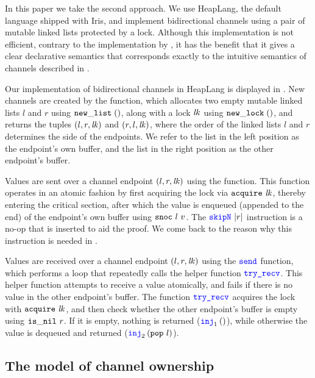 \noindent
In this paper we take the second approach.
We use HeapLang, the default language shipped with Iris, and
implement bidirectional channels using a pair of mutable linked lists protected
by a lock.
Although this implementation is not efficient, contrary to \eg the implementation
by \citet{bizjak-PACMPL2019}, it has the benefit that it gives
a clear declarative semantics that corresponds exactly to the intuitive semantics
of channels described in .

\chanencfig

Our implementation of bidirectional channels in HeapLang is displayed in
.
New channels are created by the  function, which allocates two empty mutable linked
lists $l$ and $r$ using $\mathtt{new\_list}\;()$,
along with a lock $\mathit{lk}$ using $\mathtt{new\_lock}\;()$, and returns the tuples
$(l,r,\mathit{lk})$ and $(r,l,\mathit{lk})$, where the order of the linked
lists $l$ and $r$ determines the side of the endpoints.
We refer to the list in the left position as the endpoint's own buffer,
and the list in the right position as the other endpoint's buffer.

Values are sent over a channel endpoint $(l,r,\mathit{lk})$ using the 
function.
This function operates in an atomic fashion by first acquiring the lock via
$\mathtt{acquire}\ \mathit{lk}$, thereby entering the critical section, after which the value
is enqueued (\ie appended to the end) of the endpoint's own buffer using $\mathtt{snoc}\ l\ v$.
The $\texttt{\color{blue} skipN}\ \vert r\vert$ instruction is a no-op that is inserted to aid the proof.
We come back to the reason why this instruction is needed in .

Values are received over a channel endpoint $(l,r,\mathit{lk})$ using the $\texttt{\color{blue} send}$
function, which performs a loop that repeatedly calls the helper function
$\texttt{\color{blue} try\_recv}$.
This helper function attempts to receive a value atomically, and fails if there
is no value in the other endpoint's buffer.
The function $\texttt{\color{blue} try\_recv}$ acquires the lock with
$\mathtt{acquire}\ \mathit{lk}$, and then check whether the other endpoint's buffer is empty
using $\mathtt{is\_nil}\ r$.
If it is empty, nothing is returned (\ie $\none$), while otherwise the value is
dequeued and returned (\ie $\some{(\pop\ l)}$).

\subsection{The model of channel ownership}
\label{sec:chan_own_model}

